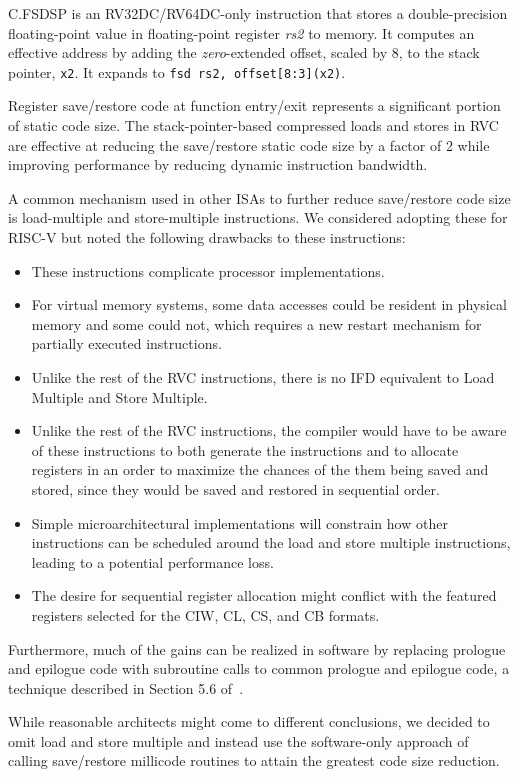 C.FSDSP is an RV32DC/RV64DC-only instruction that stores a double-precision
floating-point value in floating-point register {\em rs2} to memory.  It
computes an effective address by adding the {\em zero}-extended offset, scaled
by 8, to the stack pointer, {\tt x2}.  It expands to {\tt fsd rs2,
offset[8:3](x2)}.

\begin{commentary}
Register save/restore code at function entry/exit represents a
significant portion of static code size.  The stack-pointer-based
compressed loads and stores in RVC are effective at reducing the
save/restore static code size by a factor of 2 while improving
performance by reducing dynamic instruction bandwidth.

A common mechanism used in other ISAs to further reduce
save/restore code size is load-multiple and store-multiple
instructions.  We considered adopting these for RISC-V but noted the
following drawbacks to these instructions:
\begin{itemize}
\item These instructions complicate processor implementations.
\item For virtual memory systems, some data accesses could be
      resident in physical memory and some could not, which requires a
      new restart mechanism for partially executed instructions.
\item Unlike the rest of the RVC instructions, there is no IFD
      equivalent to Load Multiple and Store Multiple.
\item Unlike the rest of the RVC instructions, the compiler would
      have to be aware of these instructions to both generate the
      instructions and to allocate registers in an order to maximize
      the chances of the them being saved and stored, since they would
      be saved and restored in sequential order.
\item Simple microarchitectural implementations will constrain how
      other instructions can be scheduled around the load and store
      multiple instructions, leading to a potential performance loss.
\item The desire for sequential register allocation might conflict with
      the featured registers selected for the CIW, CL, CS, and CB formats.
\end{itemize}
Furthermore, much of the gains can be realized in software by replacing
prologue and epilogue code with subroutine calls to common
prologue and epilogue code, a technique described in
Section 5.6 of~\cite{waterman-phd}.

While reasonable architects might come to different conclusions, we
decided to omit load and store multiple and instead use the
software-only approach of calling save/restore millicode routines to
attain the greatest code size reduction.
\end{commentary}

